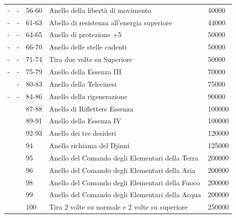 \documentclass[a4paper,11pt,twoside,openany]{book}
\begin{document}
\begin{tabular}{L{2cm} L{2cm} L{2cm} L{8cm} L{2cm}}
	-                & -                  & 56-60             & Anello della libertà di movimento                              & 40000\tabularnewline
	-                & -                  & 61-63             & Abello di resistenza all'energia superiore                                                              & 44000\tabularnewline
	-                & -                  & 64-65             & Anello di protezione +5                                                                                 & 50000\tabularnewline
	-                & -                  & 66-70             & Anello delle stelle cadenti                                           & 50000\tabularnewline
	-                & -                  & 71-74             & Tira due volte su Superiore                                                                             & 50000\tabularnewline
	-                & -                  & 75-79             & Anello della Essenza III                                                                                & 70000\tabularnewline
	                 & -                  & 80-83             & Anello della Telecinesi                                                  & 75000\tabularnewline
	-                & -                  & 84-86             & Anello della rigenerazione                                            & 90000\tabularnewline
	                 &                    & 87-88             & Anello di Riflettere Essenza                                        & 100000\tabularnewline
	                 &                    & 89-91             & Anello della Essenza IV                                                                                 & 100000\tabularnewline
	                 &                    & 92-93             & Anello dei tre desideri                                                  & 120000\tabularnewline
	                 &                    & 94                & Anello richiama del Djinni                                            & 125000\tabularnewline
	                 &                    & 95                & Anello del Comando degli Elementari della Terra  & 200000\tabularnewline
	                 &                    & 96                & Anello del Comando degli Elementari della Aria    & 200000\tabularnewline
	                 &                    & 98                & Anello del Comando degli Elementari della Fuoco  & 200000\tabularnewline
	                 &                    & 99                & Anello del Comando degli Elementari della Acqua  & 200000\tabularnewline
	                 &                    & 100               & Tira 2 volte su normale e 2 volte su superiore                                                          & 250000\tabularnewline
\end{tabular}
\end{document}
